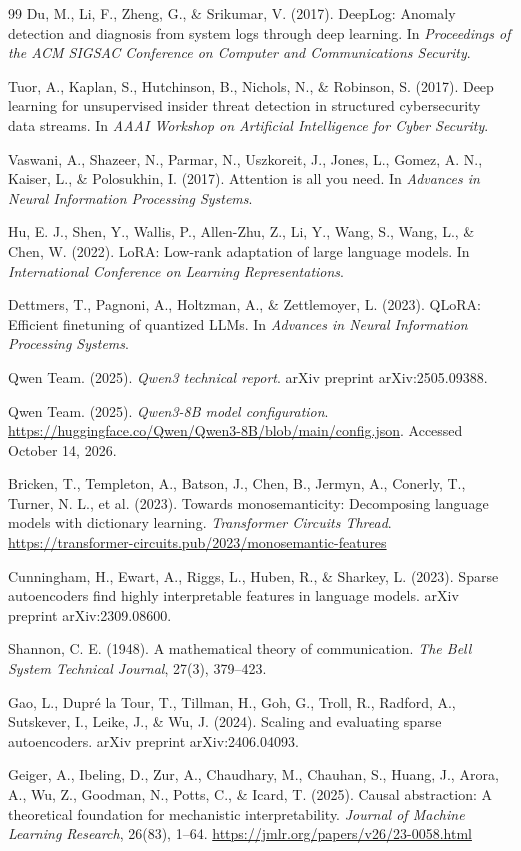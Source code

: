\documentclass[12pt]{report}
\begin{document}
\begin{thebibliography}{99}
Du, M., Li, F., Zheng, G., \& Srikumar, V. (2017).
DeepLog: Anomaly detection and diagnosis from system logs through deep learning.
In \textit{Proceedings of the ACM SIGSAC Conference on Computer and Communications Security}.

Tuor, A., Kaplan, S., Hutchinson, B., Nichols, N., \& Robinson, S. (2017).
Deep learning for unsupervised insider threat detection in structured cybersecurity data streams.
In \textit{AAAI Workshop on Artificial Intelligence for Cyber Security}.

Vaswani, A., Shazeer, N., Parmar, N., Uszkoreit, J., Jones, L., Gomez, A. N., Kaiser, L., \& Polosukhin, I. (2017).
Attention is all you need.
In \textit{Advances in Neural Information Processing Systems}.

Hu, E. J., Shen, Y., Wallis, P., Allen-Zhu, Z., Li, Y., Wang, S., Wang, L., \& Chen, W. (2022).
LoRA: Low-rank adaptation of large language models.
In \textit{International Conference on Learning Representations}.

Dettmers, T., Pagnoni, A., Holtzman, A., \& Zettlemoyer, L. (2023).
QLoRA: Efficient finetuning of quantized LLMs.
In \textit{Advances in Neural Information Processing Systems}.

Qwen Team. (2025).
\textit{Qwen3 technical report}.
arXiv preprint arXiv:2505.09388.

Qwen Team. (2025).
\textit{Qwen3-8B model configuration}.
\url{https://huggingface.co/Qwen/Qwen3-8B/blob/main/config.json}.
Accessed October 14, 2026.

Bricken, T., Templeton, A., Batson, J., Chen, B., Jermyn, A., Conerly, T., Turner, N. L., et al. (2023).
Towards monosemanticity: Decomposing language models with dictionary learning.
\textit{Transformer Circuits Thread}.
\url{https://transformer-circuits.pub/2023/monosemantic-features}

Cunningham, H., Ewart, A., Riggs, L., Huben, R., \& Sharkey, L. (2023).
Sparse autoencoders find highly interpretable features in language models.
arXiv preprint arXiv:2309.08600.

Shannon, C. E. (1948).
A mathematical theory of communication.
\textit{The Bell System Technical Journal}, 27(3), 379--423.

Gao, L., Dupr{\'e} la Tour, T., Tillman, H., Goh, G., Troll, R., Radford, A., Sutskever, I., Leike, J., \& Wu, J. (2024).
Scaling and evaluating sparse autoencoders.
arXiv preprint arXiv:2406.04093.

Geiger, A., Ibeling, D., Zur, A., Chaudhary, M., Chauhan, S., Huang, J.,
Arora, A., Wu, Z., Goodman, N., Potts, C., \& Icard, T. (2025).
Causal abstraction: A theoretical foundation for mechanistic interpretability.
\textit{Journal of Machine Learning Research}, 26(83), 1--64.
\url{https://jmlr.org/papers/v26/23-0058.html}

\end{thebibliography}
\end{document}
